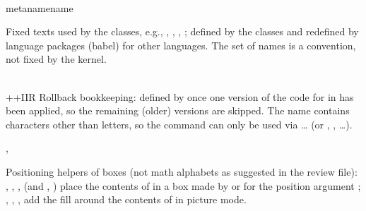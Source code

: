 


\begin{function}
  {
    \\meta{name}name
  }
  \begin{syntax}
  \end{syntax}
  Fixed texts used by the classes, e.g., ,
  , , ; defined by the
  classes and redefined by language packages (babel) for other
  languages. The set of names is a convention, not fixed by the
  kernel.
\end{function}



\begin{variable}
  {
    \\++IIR
  }
  Rollback bookkeeping: defined by  once one
  version of the code for  in  has been applied,
  so the remaining (older) versions are skipped. The name contains
  characters other than letters, so the command
  can only be used via  \ldots{}  (or
  , , \ldots).
\end{variable}



\begin{function}[int]
  {
    \bm@{},
    \mb@{}
  }
  \begin{syntax}
  \end{syntax}
  Positioning helpers of boxes (not math alphabets as suggested in
  the review file): , , ,  (and
  , ) place the contents of  in a box
  made by  or  for the position argument
  ; , , ,  add the
  fill around the contents of  in picture mode.
\end{function}


